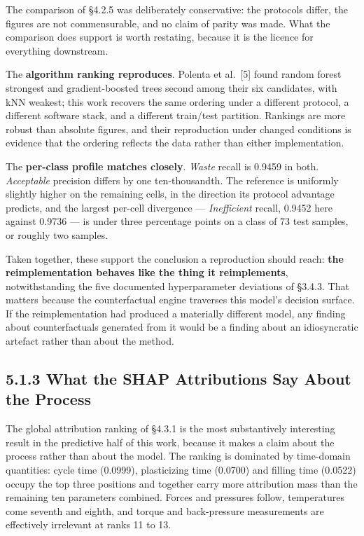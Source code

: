 The comparison of §4.2.5 was deliberately conservative: the protocols differ, the figures are not commensurable, and no claim of parity was made. What the comparison does support is worth restating, because it is the licence for everything downstream.

The \textbf{algorithm ranking reproduces}. Polenta et al.~{[}5{]} found random forest strongest and gradient-boosted trees second among their six candidates, with kNN weakest; this work recovers the same ordering under a different protocol, a different software stack, and a different train/test partition. Rankings are more robust than absolute figures, and their reproduction under changed conditions is evidence that the ordering reflects the data rather than either implementation.

The \textbf{per-class profile matches closely}. \emph{Waste} recall is 0.9459 in both. \emph{Acceptable} precision differs by one ten-thousandth. The reference is uniformly slightly higher on the remaining cells, in the direction its protocol advantage predicts, and the largest per-cell divergence --- \emph{Inefficient} recall, 0.9452 here against 0.9736 --- is under three percentage points on a class of 73 test samples, or roughly two samples.

Taken together, these support the conclusion a reproduction should reach: \textbf{the reimplementation behaves like the thing it reimplements}, notwithstanding the five documented hyperparameter deviations of §3.4.3. That matters because the counterfactual engine traverses this model's decision surface. If the reimplementation had produced a materially different model, any finding about counterfactuals generated from it would be a finding about an idiosyncratic artefact rather than about the method.

\hypertarget{what-the-shap-attributions-say-about-the-process}{%
\subsection{5.1.3 What the SHAP Attributions Say About the Process}\label{what-the-shap-attributions-say-about-the-process}}

The global attribution ranking of §4.3.1 is the most substantively interesting result in the predictive half of this work, because it makes a claim about the process rather than about the model. The ranking is dominated by time-domain quantities: cycle time (0.0999), plasticizing time (0.0700) and filling time (0.0522) occupy the top three positions and together carry more attribution mass than the remaining ten parameters combined. Forces and pressures follow, temperatures come seventh and eighth, and torque and back-pressure measurements are effectively irrelevant at ranks 11 to 13.

